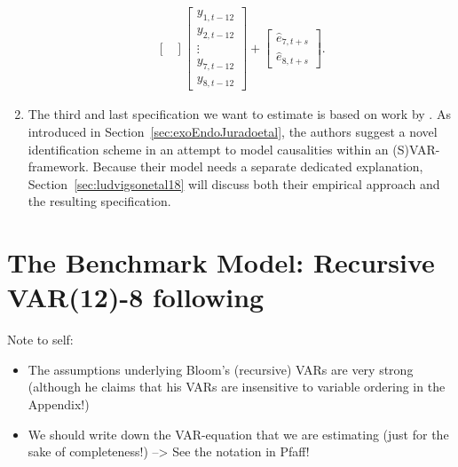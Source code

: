 \documentclass[a4paper,11pt,listof=nochaptergap,oneside,pointednumbers,bibtotoc,bigheadings,liststotoc]{scrbook}
\theoremstyle{mysatz}
\theoremstyle{mydefinition}
\theoremstyle{mybemerkung}
\let\oldhat\hat
\newcommand{\hattnobf}[1]{\oldhat{#1}}
\begin{document}
\begin{enumerate}
\begin{equation}
\begin{split}
\begin{bmatrix}
 		\end{bmatrix} 
		\begin{bmatrix}
    		y_{1,t-12} \\
    		y_{2,t-12} \\
		\vdots \\
		y_{7, t-12} \\
		y_{8, t-12}
 		\end{bmatrix} + 
		\begin{bmatrix}
    		\hattnobf{e}_{7, t+s} \\
		\hattnobf{e}_{8, t+s}
 		\end{bmatrix}. 
\end{split}								
\end{equation}

\item The third and last specification we want to estimate is based on work by \citet{ludvigsonetal:18}. As introduced in Section~\ref{sec:exoEndoJuradoetal}, the authors suggest a novel identification scheme in an attempt to model causalities within an (S)VAR-framework. Because their model needs a separate dedicated explanation, Section~\ref{sec:ludvigsonetal18} will discuss both their empirical approach and the resulting specification.

\end{enumerate}


\section{The Benchmark Model: Recursive VAR(12)-8 following \citet{bloom:09}}
\label{sec:VAR8}


\begingroup
    \fontsize{8pt}{12pt}\selectfont
    Note to self:
\begin{itemize}
	\item The assumptions underlying Bloom's (recursive) VARs are very strong (although he claims that his VARs are insensitive to variable ordering in the Appendix!)
	\item We should write down the VAR-equation that we are estimating (just for the sake of completeness!) --> See the notation in Pfaff!
\end{itemize}
\endgroup
\end{document}
